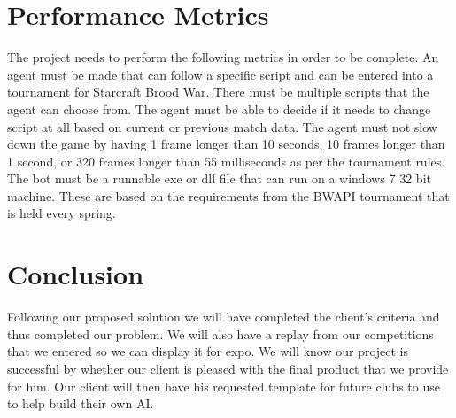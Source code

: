 \documentclass[10pt,letterpaper,onecolumn,draftclsnofoot]{IEEEtran}
\begin{document}
\section{Performance Metrics}
The project needs to perform the following metrics in order to be complete. An agent must be made that can follow a specific script and can be entered into a tournament for Starcraft Brood War. There must be multiple scripts that the agent can choose from. The agent must be able to decide if it needs to change script at all based on current or previous match data. The agent must not slow down the game by having 1 frame longer than 10 seconds, 10 frames longer than 1 second, or 320 frames longer than 55 milliseconds as per the tournament rules. The bot must be a runnable exe or dll file that can run on a windows 7 32 bit machine. These are based on the requirements from the BWAPI tournament that is held every spring.

\section{Conclusion}
Following our proposed solution we will have completed the client's criteria and thus completed our problem. We will also have a replay from our competitions that we entered so we can display it for expo. We will know our project is successful by whether our client is pleased with the final product that we provide for him. Our client will then have his requested template for future clubs to use to help build their own AI.
\end{document}
